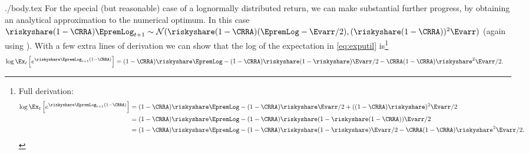 \documentclass{\handout}
\begin{document}
\begin{verbatimwrite}{./body.tex}
\hypertarget{lognormal-returns}{}
For the special (but reasonable) case of a lognormally distributed return, we can make substantial further progress, by obtaining an analytical approximation to the numerical optimum.  In this case $\riskyshare (1-\CRRA) \EpremLog_{t+1} \sim \mathcal{N}(\riskyshare (1-\CRRA)(\EpremLog - \Evarr/2),(\riskyshare(1-\CRRA))^{2}\Evarr)$ (again using \LogELogNormTimes).  With a few extra lines of derivation we can show that the log of the expectation in \eqref{eq:exputil} is\footnote{Full derivation:
\begin{equation}\begin{split}
  \log \Ex_{t}\left[e^{\riskyshare \EpremLog_{t+1}  (1-\CRRA)}\right] & =  {(1-\CRRA)\riskyshare \EpremLog-(1-\CRRA)\riskyshare\Evarr/2+ ((1-\CRRA)\riskyshare)^{2}\Evarr/2} \notag
\\  & =  {(1-\CRRA)\riskyshare \EpremLog-(1-\CRRA)\riskyshare(1-\riskyshare(1-\CRRA))\Evarr/2} 
\\  & =  {(1-\CRRA)\riskyshare \EpremLog-(1-\CRRA)\riskyshare(1-\riskyshare)\Evarr/2-\CRRA (1-\CRRA)\riskyshare^{2}\Evarr/2}. 
\end{split}\end{equation}
}
\begin{equation}\label{eq:Ex}\begin{split}
  \log \Ex_{t}\left[e^{\riskyshare \EpremLog_{t+1}  (1-\CRRA)}\right] & =  {(1-\CRRA)\riskyshare \EpremLog-(1-\CRRA)\riskyshare(1-\riskyshare)\Evarr/2-\CRRA (1-\CRRA)\riskyshare^{2}\Evarr/2}. 
\end{split}\end{equation}


\end{verbatimwrite}
\end{document}
